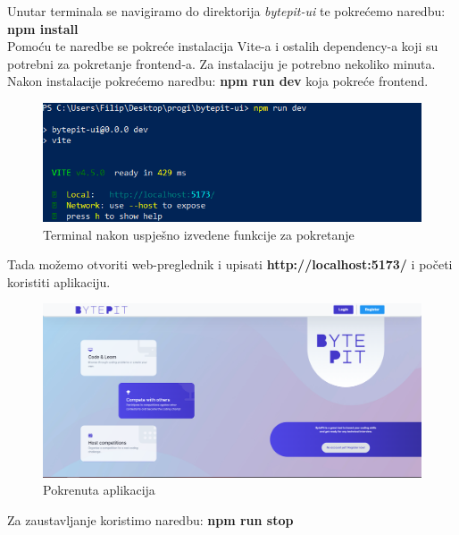 			\noindent Unutar terminala se navigiramo do direktorija \textit{bytepit-ui} te pokrećemo naredbu: \textbf{npm install}\\
			Pomoću te naredbe se pokreće instalacija Vite-a i ostalih dependency-a koji su potrebni za pokretanje frontend-a. Za instalaciju je potrebno nekoliko minuta.\\
			\noindent Nakon instalacije pokrećemo naredbu: \textbf{npm run dev} koja pokreće frontend.
			\begin{figure}[H]
				\includegraphics[scale=0.9]{slike/vite.PNG} 
				\centering
				\caption{Terminal nakon uspješno izvedene funkcije za pokretanje}
				\label{fig:vite}
			\end{figure}
			\noindent Tada možemo otvoriti web-preglednik i upisati \textbf{http://localhost:5173/} i početi koristiti aplikaciju.\\
			\begin{figure}[H]
				\includegraphics[scale=0.4]{slike/bytepit.PNG} 
				\centering
				\caption{Pokrenuta aplikacija}
				\label{fig:bytepit}
			\end{figure}
			Za zaustavljanje koristimo naredbu: \textbf{npm run stop}\\
			